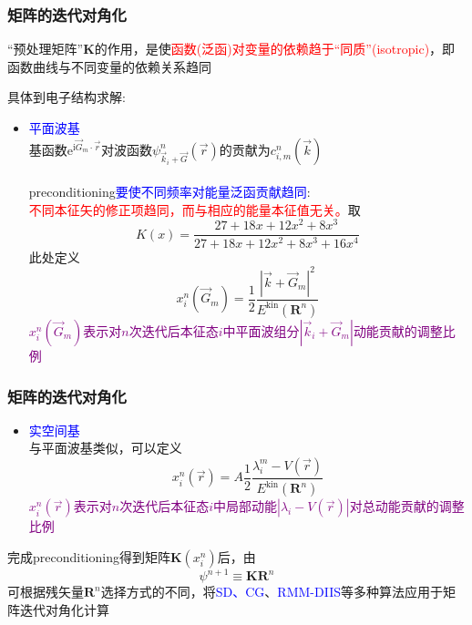 \frame
{
	\frametitle{矩阵的迭代对角化}
	``预处理矩阵''$\mathbf{K}$的作用，是使\textcolor{red}{函数(泛函)对变量的依赖趋于“同质”(\textrm{isotropic})}，即函数曲线与不同变量的依赖关系趋同

	具体到电子结构求解:~
	\begin{itemize}
		\item \textcolor{blue}{平面波基}\\
			基函数$\mathrm{e}^{\mathrm{i}\vec G_m\cdot\vec r}$对波函数$\psi_{\vec k_i+\vec G}^n(\vec r)$的贡献为$c_{i,m}^n(\vec k)$\\
		{\fontsize{7.2pt}{4.2pt}\selectfont{
		在能量泛函表达式中，高频(大的$\vec G_m$)部分比低频(小的$\vec G_m$)贡献大得多}}\\
			\textrm{preconditioning}\textcolor{blue}{要使不同频率对能量泛函贡献趋同}:\\
			\textcolor{red}{不同本征矢的修正项趋同，而与相应的能量本征值无关。}取
	\begin{displaymath}
		K(x)=\dfrac{27+18x+12x^2+8x^3}{27+18x+12x^2+8x^3+16x^4}
	\end{displaymath}
	此处定义
	\begin{displaymath}
		x_i^n(\vec G_m)=\dfrac12\dfrac{|\vec k+\vec G_m|^2}{E^{\mathrm{kin}}(\mathbf{R}^n)}
	\end{displaymath}
	\textcolor{purple}{$x_i^n(\vec G_m)$表示对$n$次迭代后本征态$i$中平面波组分$|\vec k_i+\vec G_m|$动能贡献的调整比例}
	\end{itemize}
}

\frame
{
	\frametitle{矩阵的迭代对角化}
	\begin{itemize}
		\item \textcolor{blue}{实空间基}\\
		与平面波基类似，可以定义
	\begin{displaymath}
		x_i^n(\vec r)=A\dfrac12\dfrac{\lambda_i^m-V(\vec r)}{E^{\mathrm{kin}}(\mathbf{R}^n)}
	\end{displaymath}
		\textcolor{purple}{$x_i^n(\vec r)$表示对$n$次迭代后本征态$i$中局部动能$|\lambda_i-V(\vec r)|$对总动能贡献的调整比例}
	\end{itemize}
	完成\textrm{preconditioning}得到矩阵$\mathbf{K}(x_i^n)$后，由
	\begin{displaymath}
		\psi^{n+1}\equiv\mathbf{K}\mathbf{R}^n
	\end{displaymath}
	可根据残矢量$\mathbf{R}^n$选择方式的不同，将\textcolor{blue}{\textrm{SD}、\textrm{CG}}、\textcolor{blue}{\textrm{RMM-DIIS}}等多种算法应用于矩阵迭代对角化计算
}

